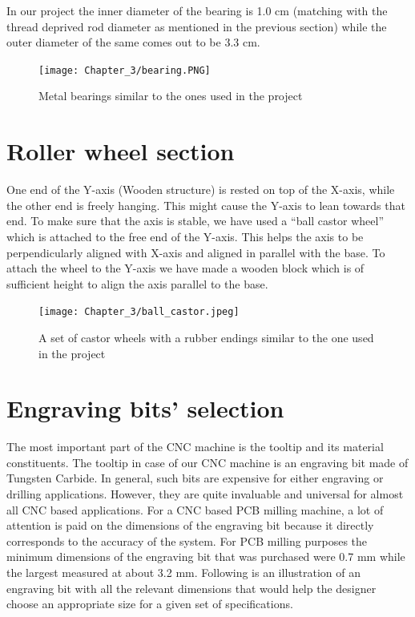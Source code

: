 In our project the inner diameter of the bearing is 1.0 cm (matching with the thread deprived rod diameter as mentioned in the previous section) while the outer diameter of the same comes out to be 3.3 cm. \pagebreak

\begin{figure}[h]
 \centering
 \texttt{[image: Chapter\_3/bearing.PNG]}
 \caption{Metal bearings similar to the ones used in the project}
 \label{fig:bearing}
\end{figure}

\section{Roller wheel section}

One end of the Y-axis (Wooden structure) is rested on top of the X-axis, while the other end is freely hanging. This might cause the Y-axis to lean towards that end. To make sure that the axis is stable, we have used a “ball castor wheel” which is attached to the free end of the Y-axis. This helps the axis to be perpendicularly aligned with X-axis and aligned in parallel with the base. To attach the wheel to the Y-axis we have made a wooden block which is of sufficient height to align the axis parallel to the base.

\begin{figure}[h]
 \centering
 \texttt{[image: Chapter\_3/ball\_castor.jpeg]}
 \caption{A set of castor wheels with a rubber endings similar to the one used in the project}
 \label{fig:ballcastor}
\end{figure}

\section{Engraving bits' selection}

The most important part of the CNC machine is the tooltip and its material constituents. The tooltip in case of our CNC machine is an engraving bit made of Tungsten Carbide. In general, such bits are expensive for either engraving or drilling applications. However, they are quite invaluable and universal for almost all CNC based applications. For a CNC based PCB milling machine, a lot of attention is paid on the dimensions of the engraving bit because it directly corresponds to the accuracy of the system. For PCB milling purposes the minimum dimensions of the engraving bit that was purchased were 0.7 mm while the largest measured at about 3.2 mm. Following is an illustration of an engraving bit with all the relevant dimensions that would help the designer choose an appropriate size for a given set of specifications.


